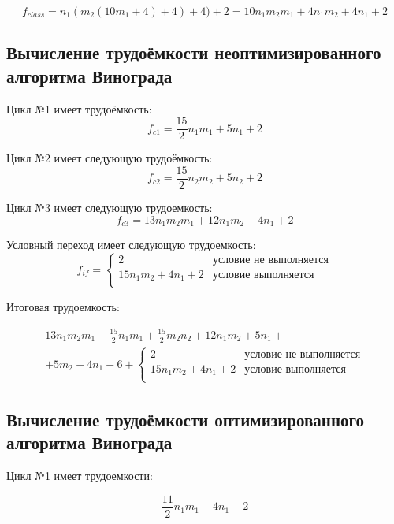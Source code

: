 \begin{equation}
f_{class} = n_1(m_2(10m_1 + 4) + 4) + 4) + 2 = 10n_1m_2m_1+ 4n_1m_2 + 4n_1 +2
\end{equation}

\subsection{Вычисление трудоёмкости неоптимизированного алгоритма Винограда}
Цикл №1 имеет трудоёмкость:
\begin{equation}
	f_{c1} = \frac{15}{2}n_1m_1 + 5n_1 + 2
\end{equation}

Цикл №2 имеет следующую трудоёмкость: 
\begin{equation}
	f_{c2} = \frac{15}{2}n_2m_2 + 5n_2 + 2
\end{equation}

Цикл №3 имеет следующую трудоемкость:
\begin{equation}
	f_{c3} = 13n_1m_2m_1 + 12n_1m_2 + 4n_1 + 2
\end{equation} 

Условный переход имеет следующую трудоемкость: 
\begin{equation}
	f_{if} = \begin{cases}
	2    &\text{условие не выполняется}\\
	15n_1m_2 + 4n_1 + 2 &\text{условие выполняется}\\
	\end{cases}
\end{equation}

Итоговая трудоемкость:

\begin{align*} 
	13n_1m_2m_1 + \frac{15}{2}n_1m_1 +\frac{15}{2}m_2n_2 + 12n_1m_2 + 5n_1 + \\
	+ 5m_2 + 4n_1 + 6 + 
	\begin{cases}
	2    &\text{условие не выполняется}\\
	15n_1m_2 + 4n_1 + 2 &\text{условие выполняется}\\
	\end{cases}
\end{align*}

\subsection{Вычисление трудоёмкости оптимизированного алгоритма Винограда}
Цикл №1 имеет трудоемкости: 

\begin{equation}
\frac{11}{2}n_1m_1 + 4n_1 + 2 
\end{equation}

